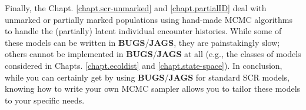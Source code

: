 Finally, the Chapt. \ref {chapt.scr-unmarked} and \ref {chapt.partialID} deal with unmarked or 
partially marked populations using hand-made MCMC algorithms to 
handle the (partially) latent individual encounter histories. 
While some of these models can be written in {\bf BUGS}/{\bf JAGS}, they are painstakingly slow; others cannot be implemented in 
 {\bf BUGS}/{\bf JAGS} at all (e.g., the classes of models
 considered in Chapts. \ref{chapt.ecoldist} and  \ref{chapt.state-space}).
In conclusion, while you can certainly get by using {\bf BUGS}/{\bf JAGS} 
for standard SCR models, knowing how to write your own MCMC sampler 
allows you to tailor these models to your specific needs.

